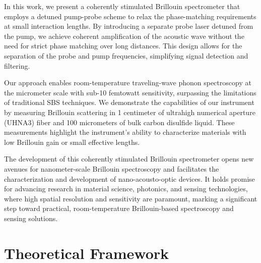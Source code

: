 \documentclass[%
  reprint,
  superscriptaddress,
  amsmath,amssymb,
  aps,
  prapplied,
]{revtex4-2}
\begin{document}
In this work, we present a coherently stimulated Brillouin spectrometer that employs a detuned pump-probe scheme to relax the phase-matching requirements at small interaction lengths. By introducing a separate probe laser detuned from the pump, we achieve coherent amplification of the acoustic wave without the need for strict phase matching over long distances. This design allows for the separation of the probe and pump frequencies, simplifying signal detection and filtering.

Our approach enables room-temperature traveling-wave phonon spectroscopy at the micrometer scale with sub-10 femtowatt sensitivity, surpassing the limitations of traditional SBS techniques. We demonstrate the capabilities of our instrument by measuring Brillouin scattering in 1 centimeter of ultrahigh numerical aperture (UHNA3) fiber and 100 micrometers of bulk carbon disulfide liquid. These measurements highlight the instrument's ability to characterize materials with low Brillouin gain or small effective lengths.

The development of this coherently stimulated Brillouin spectrometer opens new avenues for nanometer-scale Brillouin spectroscopy and facilitates the characterization and development of nano-acousto-optic devices. It holds promise for advancing research in material science, photonics, and sensing technologies, where high spatial resolution and sensitivity are paramount, marking a significant step toward practical, room-temperature Brillouin-based spectroscopy and sensing solutions.

\section{Theoretical Framework}
\label{Theoretical Framework}
\end{document}
